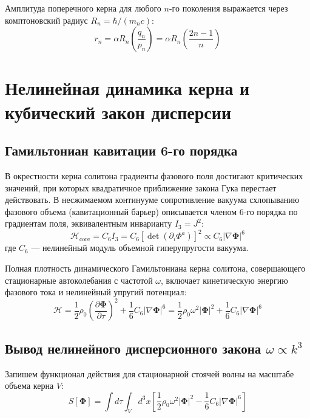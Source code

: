 \documentclass[12pt,a4paper]{article}
\begin{document}
	Амплитуда поперечного керна для любого $n$-го поколения выражается через комптоновский радиус $R_n = \hbar / (m_n c)$:
	\begin{equation}
		r_n = \alpha R_n \left( \frac{q_n}{p_n} \right) = \alpha R_n \left( \frac{2n-1}{n} \right)
	\end{equation}
	
	\section{Нелинейная динамика керна и кубический закон дисперсии}
	
	\subsection{Гамильтониан кавитации 6-го порядка}
	В окрестности керна солитона градиенты фазового поля достигают критических значений, при которых квадратичное приближение закона Гука перестает действовать. В несжимаемом континууме сопротивление вакуума схлопыванию фазового объема (кавитационный барьер) описывается членом 6-го порядка по градиентам поля, эквивалентным инварианту $I_3 = J^2$:
	\begin{equation}
		\mathcal{H}_{\text{core}} = C_6 I_3 = C_6 \left[ \det\left(\partial_i \Phi^a\right) \right]^2 \propto C_6 |\nabla \boldsymbol{\Phi}|^6
	\end{equation}
	где $C_6$ — нелинейный модуль объемной гиперупругости вакуума.
	
	Полная плотность динамического Гамильтониана керна солитона, совершающего стационарные автоколебания с частотой $\omega$, включает кинетическую энергию фазового тока и нелинейный упругий потенциал:
	\begin{equation}
		\mathcal{H} = \frac{1}{2} \rho_0 \left( \frac{\partial \boldsymbol{\Phi}}{\partial \tau} \right)^2 + \frac{1}{6} C_6 |\nabla \boldsymbol{\Phi}|^6 = \frac{1}{2} \rho_0 \omega^2 |\boldsymbol{\Phi}|^2 + \frac{1}{6} C_6 |\nabla \boldsymbol{\Phi}|^6
	\end{equation}
	
	\subsection{Вывод нелинейного дисперсионного закона $\omega \propto k^3$}
	Запишем функционал действия для стационарной стоячей волны на масштабе объема керна $V$:
	\begin{equation}
		S[\boldsymbol{\Phi}] = \int d\tau \int_V d^3x \left[ \frac{1}{2} \rho_0 \omega^2 |\boldsymbol{\Phi}|^2 - \frac{1}{6} C_6 |\nabla \boldsymbol{\Phi}|^6 \right]
	\end{equation}
	
\end{document}

